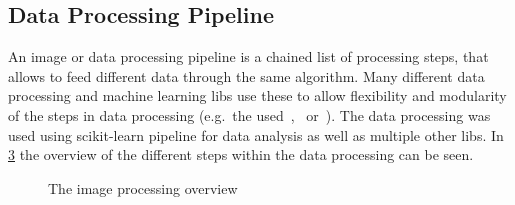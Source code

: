 \documentclass[12pt,a4paper, english]{article}
\begin{document}
    \subsection{Data Processing Pipeline}
      An image or data processing pipeline is a chained list of processing steps, that allows to feed different data through the same algorithm. 
      Many different data processing and machine learning \glspl{lib} use these to allow flexibility and modularity of the steps in data processing (e.g.\ the used~\autocite{scikit-learn},~\autocite{keras} or~\autocite{gluon}). 
      The data processing was used using scikit-learn pipeline for data analysis as well as multiple other \glspl{lib}. 
      In \cref{fig:pipeline} the overview of the different steps within the data processing can be seen.
      \begin{figure}[!htbp]
         \begin{subfigure}[b]{0.50\textwidth}
           
           \label{fig:pipelineTraining}
         \end{subfigure}
         \begin{subfigure}[b]{0.50\textwidth}
           
           \label{fig:pipelineTrained}
         \end{subfigure}
         \caption{The image processing overview\label{fig:pipeline}}
       \end{figure}
  \newpage
\end{document}
